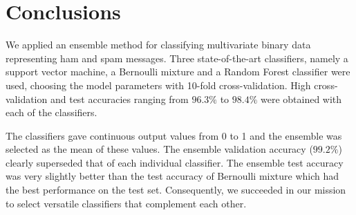 \section{Conclusions}

We applied an ensemble method for classifying multivariate binary data
representing ham and spam messages. Three state-of-the-art classifiers,
namely a support vector machine, a Bernoulli mixture and a Random Forest
classifier were used, choosing the model parameters with 10-fold
cross-validation. High cross-validation and test accuracies ranging from
$96.3 \%$ to $98.4 \%$ were obtained with each of the classifiers.

The classifiers gave continuous output values from 0 to 1 and the
ensemble was selected as the mean of these values. The ensemble
validation accuracy ($99.2 \%$) clearly superseded that of each
individual classifier. The ensemble test accuracy was very slightly better than the test
accuracy of Bernoulli mixture which had the best performance on the test
set. Consequently, we succeeded in our mission to select versatile
classifiers that complement each other.

